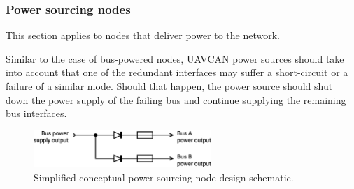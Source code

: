 \subsubsection{Power sourcing nodes}

This section applies to nodes that deliver power to the network.

Similar to the case of bus-powered nodes,
UAVCAN power sources should take into account that one of the redundant interfaces may suffer a
short-circuit or a failure of a similar mode.
Should that happen, the power source should shut down the power supply of the failing bus and continue supplying
the remaining bus interfaces.

\begin{figure}[H]
    \centering
	\includegraphics[width=0.6\textwidth]{physical_layer/redundant_bus_power_source}
	\caption{Simplified conceptual power sourcing node design schematic.\label{fig:phy_redundant_bus_power_source}}
\end{figure}
